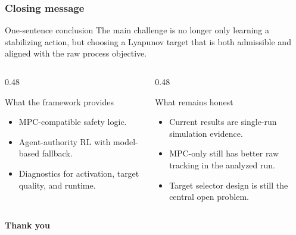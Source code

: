\documentclass[aspectratio=169]{beamer}
\begin{document}
\begin{frame}
\frametitle{\large \textbf{Closing message}}
\small

\begin{block}{One-sentence conclusion}
\justifying
The main challenge is no longer only learning a stabilizing action, but choosing a Lyapunov target that is both admissible and aligned with the raw process objective.
\end{block}

\vspace{0.12cm}
\begin{columns}[T,onlytextwidth]
\begin{column}{0.48\textwidth}
\begin{block}{What the framework provides}
\begin{itemize}\justifying
  \setlength\itemsep{0.35ex}
  \item MPC-compatible safety logic.
  \item Agent-authority RL with model-based fallback.
  \item Diagnostics for activation, target quality, and runtime.
\end{itemize}
\end{block}
\end{column}
\begin{column}{0.48\textwidth}
\begin{block}{What remains honest}
\begin{itemize}\justifying
  \setlength\itemsep{0.35ex}
  \item Current results are single-run simulation evidence.
  \item MPC-only still has better raw tracking in the analyzed run.
  \item Target selector design is still the central open problem.
\end{itemize}
\end{block}
\end{column}
\end{columns}

\vspace{0.1cm}
\begin{center}
{\large \textbf{Thank you}}
\end{center}
\end{frame}

\appendix
\end{document}
